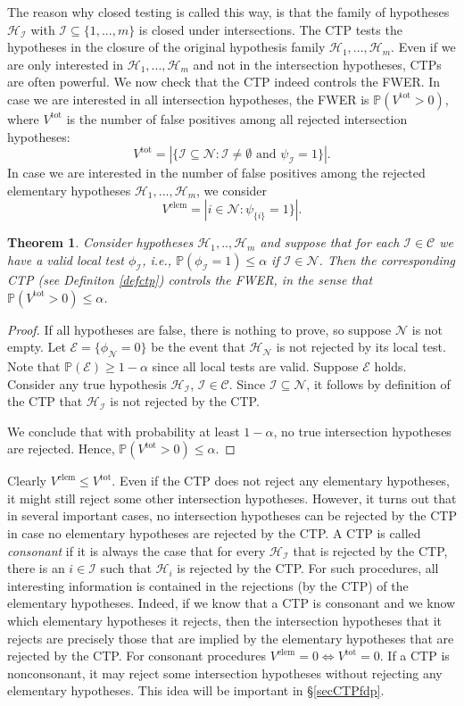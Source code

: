 \documentclass[11pt]{article}
\theoremstyle{plain}
\newtheorem{theorem}{Theorem}[section]
\theoremstyle{definition}
\newcommand{\N}{\mathcal{N}}
\newcommand{\I}{\mathcal{I}}
\newcommand{\E}{\mathcal{E}}
\newcommand{\Hy}{\mathcal{H}}
\newcommand{\pr}{\mathbb{P}}
\newcommand{\subs}{\mathcal{C}}
\begin{document}
The reason why closed testing is called this way, is that the family of hypotheses $\Hy_{\I}$ with $\I\subseteq\{1,...,m\}$ is closed under intersections. The CTP tests the hypotheses in the closure  of the original hypothesis family $\Hy_1,...,\Hy_m$.
Even if we are  only interested in $\Hy_1,...,\Hy_m$ and not in the intersection hypotheses, CTPs are often powerful. We now check that the CTP indeed controls the FWER. In case we are interested in all intersection hypotheses, the FWER is $\pr(V^{\text{tot}}>0)$, where $V^{\text{tot}}$ is  the number of false positives among all rejected intersection hypotheses: 
$$V^{\text{tot}}= |\{\I\subseteq\N:  \I\neq\emptyset\text{ and }  \psi_{\I}=1\}|.$$
In case we are interested in the number of false positives among the rejected elementary hypotheses $\Hy_1,...,\Hy_m$, we consider
$$V^{\text{elem}}= |i\in \N:   \psi_{\{i\}}=1\}|.$$
\begin{theorem} \label{thmctp}
Consider hypotheses $\Hy_1,..,\Hy_m$ and suppose that for each $\I\in \subs$ we have a valid local test $\phi_{\I}$,  i.e., $\pr(\phi_{\I}=1)\leq \alpha $ if $\I\in \N$.
Then the corresponding CTP (see Definiton \ref{defctp}) controls the FWER, in the sense that $\pr(V^{\text{tot}}>0)\leq \alpha$. 
\end{theorem}
\begin{proof}
If all hypotheses are false, there is nothing to prove, so suppose $\N$ is not empty.
Let $\E = \{\phi_{\N}=0\}$ be the event that $\Hy_{\N}$ is not rejected by its local test. Note that $\pr(\E)\geq 1-\alpha$ since all local tests are valid.
Suppose $\E$ holds.
Consider any true hypothesis $\Hy_{\I}$, $\I\in \subs$. Since $\I\subseteq\N$, it follows by definition of the CTP that $\Hy_{\I}$ is not rejected by the CTP. 

We conclude that with probability at least $1-\alpha$, no true intersection hypotheses are rejected. Hence, $\pr(V^{\text{tot}}>0)\leq \alpha$.
\end{proof}

Clearly $V^{\text{elem}}\leq V^{\text{tot}}$. Even if the CTP does not reject any elementary hypotheses, it might still reject some other intersection hypotheses. %
However, it turns out that in several important cases, no intersection hypotheses can be rejected by the CTP in case no elementary hypotheses are rejected by the CTP. A CTP is called \emph{consonant} if it is always the case that for every $\Hy_{\I}$ that is rejected by the CTP, there is an $i\in \I$ such that $\Hy_{i}$ is rejected by the CTP. For such procedures, all interesting information is contained in the rejections (by the CTP) of the elementary hypotheses. Indeed, if we know that a CTP is consonant and we know which elementary hypotheses it rejects, then the intersection hypotheses that it rejects  are precisely those that are implied by the elementary hypotheses that are rejected by the CTP. For consonant procedures $V^{\text{elem}}=0\Leftrightarrow V^{\text{tot}}=0$.
If a CTP is nonconsonant, it may reject some intersection hypotheses without rejecting any elementary hypotheses. This idea will be important in \S\ref{secCTPfdp}. 
\end{document}
